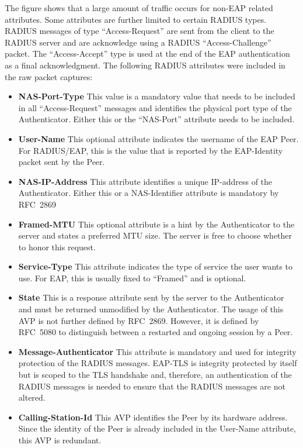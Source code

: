 The figure shows that a large amount of traffic occurs for non-\ac{EAP} related attributes. Some attributes are further limited to certain RADIUS types. RADIUS messages of type ``Access-Request'' are sent from the client to the RADIUS server and are acknowledge using a RADIUS ``Access-Challenge'' packet. The ``Access-Accept'' type is used at the end of the \ac{EAP} authentication as a final acknowledgment. The following RADIUS attributes were included in the raw packet captures:

\begin{itemize}
    \item \textbf{NAS-Port-Type} This value is a mandatory value that needs to be included in all ``Access-Request'' messages and identifies the physical port type of the Authenticator. Either this or the ``NAS-Port'' attribute needs to be included.\cite{rfc2865}
    \item \textbf{User-Name} This optional attribute indicates the username of the \ac{EAP} Peer. For RADIUS/EAP, this is the value that is reported by the EAP-Identity packet sent by the Peer.
    \item \textbf{NAS-IP-Address} This attribute identifies a unique IP-address of the Authenticator. Either this or a NAS-Identifier attribute is mandatory by RFC~2869\cite{rfc2869}
    \item \textbf{Framed-MTU} This optional attribute is a hint by the Authenticator to the server and states a preferred MTU size. The server is free to choose whether to honor this request.\cite{rfc2865} 
    \item \textbf{Service-Type} This attribute indicates the type of service the user wants to use. For \ac{EAP}, this is usually fixed to ``Framed'' and is optional.
    \item \textbf{State} This is a response attribute sent by the server to the Authenticator and must be returned unmodified by the Authenticator. The usage of this AVP is not further defined by RFC~2869\cite{rfc2865}. However, it is defined by RFC~5080 to distinguish between a restarted and ongoing session by a Peer.
    \item \textbf{Message-Authenticator} This attribute is mandatory and used for integrity protection of the RADIUS messages. EAP-TLS is integrity protected by itself but is scoped to the TLS handshake and, therefore, an authentication of the RADIUS messages is needed to ensure that the RADIUS messages are not altered.
    \item \textbf{Calling-Station-Id} This AVP identifies the Peer by its hardware address. Since the identity of the Peer is already included in the User-Name attribute, this AVP is redundant.

\end{itemize}
